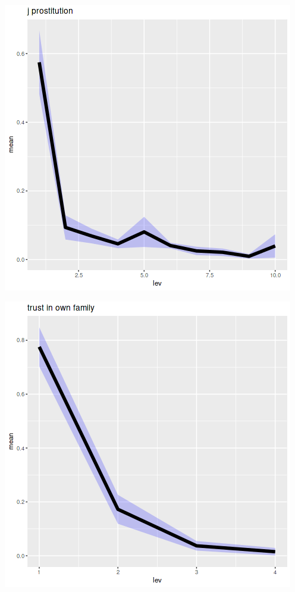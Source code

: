 \documentclass{amsart}
\begin{document}
\includegraphics[scale=0.6]{jprost.png}


\includegraphics[scale=0.6]{trust_fam.png}
\end{document}
